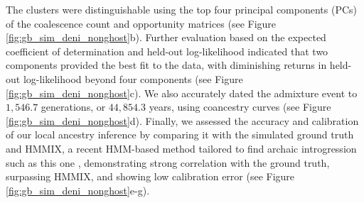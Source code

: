 The clusters were distinguishable using the top four principal components (PCs) of the coalescence count and opportunity matrices (see Figure \ref{fig:gb_sim_deni_nonghost}b). Further evaluation based on the expected coefficient of determination and held-out log-likelihood indicated that two components provided the best fit to the data, with diminishing returns in held-out log-likelihood beyond four components (see Figure \ref{fig:gb_sim_deni_nonghost}c). We also accurately dated the admixture event to $1{,}546.7$ generations, or $44{,}854.3$ years, using coancestry curves (see Figure \ref{fig:gb_sim_deni_nonghost}d). Finally, we assessed the accuracy and calibration of our local ancestry inference by comparing it with the simulated ground truth and HMMIX, a recent HMM-based method tailored to find archaic introgression such as this one \cite{skov2018detecting}, demonstrating strong correlation with the ground truth, surpassing HMMIX, and showing low calibration error (see Figure \ref{fig:gb_sim_deni_nonghost}e-g).

